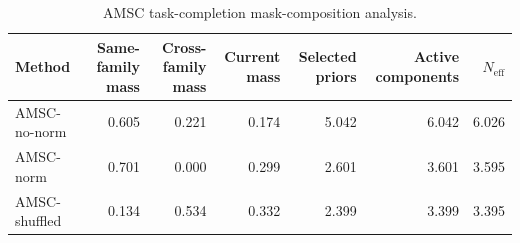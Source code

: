 \begin{table}[ht]
    \caption{AMSC task-completion mask-composition analysis.}
    \label{tbl:amsc_composition}
    \centering
    \scriptsize
    \begin{tabular}{lrrrrrr}
    \toprule
Method & Same-family mass & Cross-family mass & Current mass & Selected priors & Active components & $N_{\mathrm{eff}}$ \\
    \midrule
AMSC-no-norm & 0.605 & 0.221 & 0.174 & 5.042 & 6.042 & 6.026 \\
AMSC-norm & 0.701 & 0.000 & 0.299 & 2.601 & 3.601 & 3.595 \\
AMSC-shuffled & 0.134 & 0.534 & 0.332 & 2.399 & 3.399 & 3.395 \\
    \bottomrule
    \end{tabular}
\end{table}
